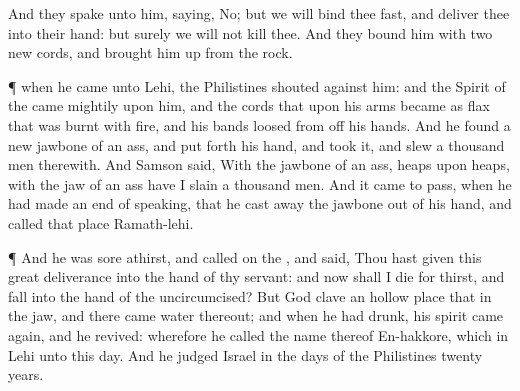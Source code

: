 {And they
spake unto him,
saying, No; but we will
bind thee
fast, and
deliver thee into their
hand: but
surely we will not
kill thee. And they
bound him with
two
new
cords, and brought him
up from the
rock.
\par }{\PP {}¶
{} when he
came unto
Lehi, the
Philistines
shouted
against him: and the
Spirit of the
{} came
mightily upon him, and the
cords that
{} upon his
arms became as
flax that was
burnt with
fire, and his
bands
loosed from off his
hands.
And he
found a
new
jawbone of an
ass, and put
forth his
hand, and
took it, and
slew a
thousand
men therewith.
And
Samson
said, With the
jawbone of an
ass,
heaps upon
heaps, with the
jaw of an
ass have I
slain a
thousand
men.
And it came to pass, when he had made an
end of
speaking, that he cast
away the
jawbone out of his
hand, and
called that
place
Ramath-lehi.
\par }{\PP {}¶ And he was
sore
athirst, and
called on the
{}, and
said, Thou hast
given this
great
deliverance into the
hand of thy
servant: and now shall I
die for
thirst, and
fall into the
hand of the
uncircumcised?
But
God
clave an hollow
place that
{} in the
jaw, and there
came
water thereout; and when he had
drunk, his
spirit came
again, and he
revived: wherefore he
called the
name thereof
En-hakkore, which
{} in
Lehi unto this
day.
And he
judged
Israel in the
days of the
Philistines
twenty
years.

}
